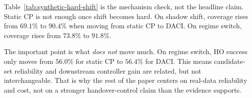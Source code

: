 \documentclass[conference]{IEEEtran}
\begin{document}
\begin{table}[t]
\caption{Synthetic Hard-Shift Results}
\label{tab:synthetic-hard-shift}
\centering
\scriptsize
{}
\end{table}

Table~\ref{tab:synthetic-hard-shift} is the mechanism check, not the headline claim. Static CP is not enough once shift becomes hard. On shadow shift, coverage rises from $69.1\%$ to $90.4\%$ when moving from static CP to DACI. On regime switch, coverage rises from $73.8\%$ to $91.8\%$.

The important point is what \emph{does not} move much. On regime switch, HO success only moves from $56.0\%$ for static CP to $56.4\%$ for DACI. This means candidate-set reliability and downstream controller gain are related, but not interchangeable. That is why the rest of the paper centers on real-data reliability and cost, not on a stronger handover-control claim than the evidence supports.
\end{document}
